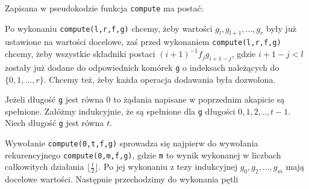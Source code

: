 \documentclass{article}
\begin{document}
Zapisana w pseudokodzie funkcja \texttt{compute} ma postać:

\begin{algorithm}
\end{algorithm}
  


Po wykonaniu \texttt{compute(l,r,f,g)} chcemy, żeby wartości $g_l,g_{l+1},...,g_{r}$ były już ustawione na wartości docelowe, zaś
przed wykonaniem \texttt{compute(l,r,f,g)} chcemy, żeby wszystkie składniki postaci $(i+1)^{-1}f_jg_{i+1-j}$, gdzie $i+1-j<l$ zostały
już dodane do odpowiednich komórek \texttt{g} o indeksach należących do $\{0,1,...,r\}$. Chcemy też, żeby każda operacja dodawania
była dozwolona. 

Jeżeli długość \texttt{g} jest równa $0$ to żądania napisane w poprzednim akapicie są spełnione. 
Załóżmy indukcyjnie, że są spełnione dla \texttt{g} długości $0,1,2,..,t-1$. Niech długość \texttt{g} jest równa $t$.

Wywołanie \texttt{compute(0,t,f,g)} sprowadza się najpierw do wywołania rekurencyjnego \texttt{compute(0,m,f,g)}, gdzie \texttt{m} to wynik wykonanej w
liczbach całkowitych działania $\lfloor \frac{t}{2}\rfloor$. Po jej wykonaniu z tezy indukcyjnej $g_0,g_2,...,g_m$ mają docelowe
wartości. Następnie przechodzimy do wykonania pętli

\begin{algorithm}[H]
\end{algorithm}
   
\end{document}
